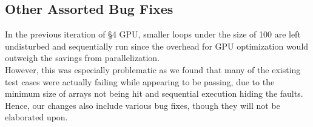\subsection*{Other Assorted Bug Fixes}
In the previous iteration of \S 4 GPU, smaller loops under the size of 100 are left undisturbed and sequentially run since the overhead for GPU optimization would outweigh the savings from parallelization.\\

However, this was especially problematic as we found that many of the existing test cases were actually failing while appearing to be passing, due to the minimum size of arrays not being hit and sequential execution hiding the faults. Hence, our changes also include various bug fixes, though they will not be elaborated upon.


\newpage



\newpage





